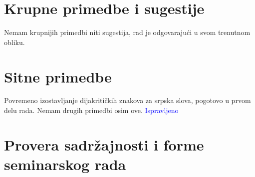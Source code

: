 \documentclass[a4paper]{report}
\newcommand{\odgovor}[1]{\textcolor{blue}{#1}}
\begin{document}
\section{Krupne primedbe i sugestije}
Nemam krupnijih primedbi niti sugestija, rad je odgovarajući u svom trenutnom obliku.

\section{Sitne primedbe}
Povremeno izostavljanje dijakritičkih znakova za srpska slova, pogotovo u prvom delu rada. Nemam drugih primedbi osim ove.
\odgovor{Ispravljeno}

\section{Provera sadržajnosti i forme seminarskog rada}
\end{document}
